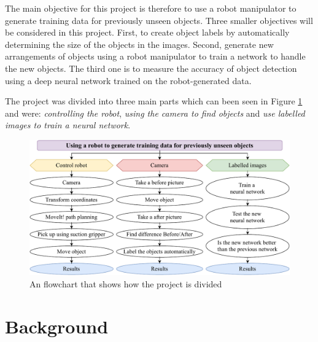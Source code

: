 The main objective for this project is therefore to use a robot manipulator to generate training data for previously unseen objects. Three smaller objectives will be considered in this project. First, to create object labels by automatically determining the size of the objects in the images. Second, generate new arrangements of objects using a robot manipulator to train a network to handle the new objects. The third one is to measure the accuracy of object detection using a deep neural network trained on the robot-generated data.

The project was divided into three main parts which can been seen in Figure \ref{fig:project} and were: \textit{controlling the robot}, \textit{using the camera to find objects} and \textit{use labelled images to train a neural network}. 
\begin{figure}[h]
    \centering
    \includegraphics[width=1\textwidth]{graphics/meis.pdf}
    \caption{An flowchart that shows how the project is divided}
    \label{fig:project}
\end{figure}


\section{Background}


